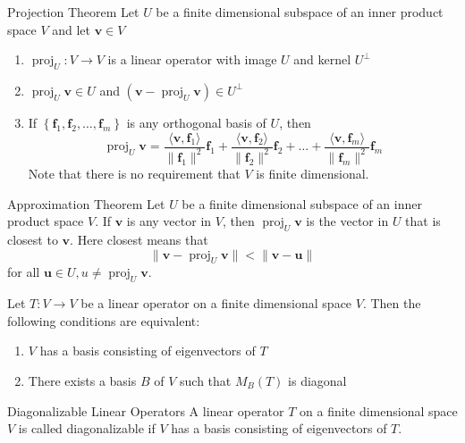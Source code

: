 \documentclass[12pt]{article}
\begin{document}
\begin{theorem}{Projection Theorem}{}
    Let $ U $ be a finite dimensional subspace of an inner product space $ V $ and let $ \mathbf{v} \in V $
    \begin{enumerate}[label=(\roman*)]
        \item $ \operatorname{proj}_U : V \to V $ is a linear operator with image $ U $ and kernel $ U^\perp $
        \item $ \operatorname{proj}_U \mathbf{v} \in U $ and $ \left( \mathbf{v} - \operatorname{proj}_U \mathbf{v} \right) \in U^\perp $
        \item If $ \left\{ \mathbf{f}_1, \mathbf{f}_2, \dots, \mathbf{f}_m \right\} $ is any orthogonal basis of $ U $, then
        \[ \operatorname{proj}_U \mathbf{v} = \frac{\langle \mathbf{v}, \mathbf{f}_1 \rangle}{\lVert \mathbf{f}_1 \rVert^2} \mathbf{f}_1 + \frac{\langle \mathbf{v}, \mathbf{f}_2 \rangle}{\lVert \mathbf{f}_2 \rVert^2} \mathbf{f}_2 + \dots + \frac{\langle \mathbf{v}, \mathbf{f}_m \rangle}{\lVert \mathbf{f}_m \rVert^2} \mathbf{f}_m \]
        Note that there is no requirement that $ V $ is finite dimensional.
    \end{enumerate}
\end{theorem}

\begin{theorem}{Approximation Theorem}{}
    Let $ U $ be a finite dimensional subspace of an inner product space $ V $. If $ \mathbf{v} $ is any vector in $ V $, then $ \operatorname{proj}_U \mathbf{v} $ is the vector in $ U $ that is closest to $ \mathbf{v} $. Here closest means that
    \[ \lVert \mathbf{v} - \operatorname{proj}_U \mathbf{v} \rVert < \lVert \mathbf{v} - \mathbf{u} \rVert \]
    for all $ \mathbf{u} \in U, u \neq \operatorname{proj}_U \mathbf{v} $.
\end{theorem}

\begin{theorem}{}{}
    Let $ T : V \to V $ be a linear operator on a finite dimensional space $ V $. Then the following conditions are equivalent:
    \begin{enumerate}[label=(\roman*)]
        \item $ V $ has a basis consisting of eigenvectors of $ T $
        \item There exists a basis $ B $ of $ V $ such that $ M_B \left( T \right) $ is diagonal
    \end{enumerate}
\end{theorem}

\begin{definition}{Diagonalizable Linear Operators}{}
    A linear operator $ T $ on a finite dimensional space $ V $ is called diagonalizable if $ V $ has a basis consisting of eigenvectors of $ T $.
\end{definition}
\end{document}
